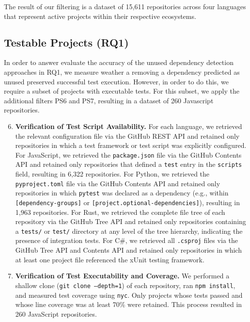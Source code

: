 The result of our filtering is a dataset of 15,611 repositories across four languages that represent active projects within their respective ecosystems.

\subsection{Testable Projects (RQ1)}
In order to answer evaluate the accuracy of the unused dependency detection approaches in RQ1, we measure weather a removing a dependency predicted as unused preserved successful test execution. However, in order to do this, we require a subset of projects with executable tests. For this subset, we apply the additional filters PS6 and PS7, resulting in a dataset of 260 Javascript repositories.


\begin{enumerate}[label={\textbf{(PS\arabic*).}}, leftmargin=50pt]
\setcounter{enumi}{5}
    \item \textbf{Verification of Test Script Availability.}
    For each language, we retrieved the relevant configuration file via the GitHub REST API and retained only repositories in which a test framework or test script was explicitly configured.
    For JavaScript, we retrieved the \texttt{package.json} file via the GitHub Contents API and retained only repositories that defined a \texttt{test} entry in the \texttt{scripts} field, resulting in 6,322 repositories.
    For Python, we retrieved the \texttt{pyproject.toml} file via the GitHub Contents API and retained only repositories in which \texttt{pytest} was declared as a dependency (e.g., within \texttt{[dependency-groups]} or \texttt{[project.optional-dependencies]}), resulting in 1,963 repositories.
    For Rust, we retrieved the complete file tree of each repository via the GitHub Tree API and retained only repositories containing a \texttt{tests/} or \texttt{test/} directory at any level of the tree hierarchy, indicating the presence of integration tests.
    For C\#, we retrieved all \texttt{.csproj} files via the GitHub Tree API and Contents API and retained only repositories in which at least one project file referenced the xUnit testing framework.
    \item \textbf{Verification of Test Executability and Coverage.}
    We performed a shallow clone (\texttt{git clone --depth=1}) of each repository, ran \texttt{npm install}, and measured test coverage using \texttt{nyc}. Only projects whose tests passed and whose line coverage was at least 70\% were retained. This process resulted in 260 JavaScript repositories.
\end{enumerate}


